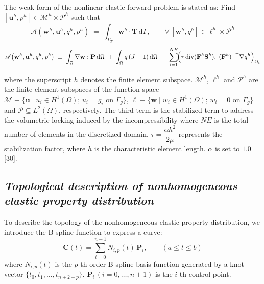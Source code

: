 \documentclass[11pt]{article}
\begin{document}
The weak form of the nonlinear elastic forward problem is stated as:
Find $[\mathbf{u}^h, p^h] \in \mathscr{M}^h \times \mathscr{P}^h$
such that
\begin{equation}
\mathscr{A}\!\left(\mathbf{w}^h,\mathbf{u}^h,q^h,p^h\right)
\;=\;
\int_{\Gamma_T}\! \mathbf{w}^h\!\cdot\mathbf{T}\,\mathrm{d}\Gamma,
\qquad
\forall\,[\mathbf{w}^h, q^h] \in \ell^h \times \mathscr{P}^h
\end{equation}
\begin{equation}
\mathscr{A}\!\left(\mathbf{w}^h,\mathbf{u}^h,q^h,p^h\right)
\;\equiv\;
\int_\Omega \nabla\mathbf{w}:\mathbf{P}\,\mathrm{d}\Omega
\;+\;
\int_\Omega q\,(J-1)\,\mathrm{d}\Omega
\;-\;
\sum_{i=1}^{NE}\!
 \Bigl(\tau\,\mathrm{div}(\mathbf{F}^h\mathbf{S}^h),\;
       (\mathbf{F}^h)^{-\mathsf{T}}\nabla q^h\Bigr)_{\Omega_i}
\end{equation}

\newpage

\setcounter{equation}{4}

\noindent
where the superscript $h$ denotes the finite element subspace.
$\mathscr{M}^h$, $\ell^h$ and $\mathscr{P}^h$ are the finite-element
subspaces of the function space
$\mathscr{M} \equiv \{\mathbf{u} \mid u_i \in H^1(\Omega);\,
u_i = g_i \text{ on } \Gamma_g\}$,
$\ell \equiv \{\mathbf{w} \mid w_i \in H^1(\Omega);\,
w_i = 0 \text{ on } \Gamma_g\}$ and
$\mathscr{P} \subseteq L^2(\Omega)$, respectively. The third term is
the stabilized term to address the volumetric locking induced by the
incompressibility where $NE$ is the total number of elements in the
discretized domain. $\tau = \dfrac{\alpha h^{2}}{2\mu}$ represents the
stabilization factor, where $h$ is the characteristic element length.
$\alpha$ is set to $1.0$ [30].

\subsection*{\textit{Topological description of nonhomogeneous elastic property distribution}}

\noindent
To describe the topology of the nonhomogeneous elastic property
distribution, we introduce the B-spline function to express a curve:
\begin{equation}
\mathbf{C}(t) = \sum_{i=0}^{n+1} N_{i,p}(t)\,\mathbf{P}_i,
\qquad (a \leq t \leq b)
\end{equation}
where $N_{i,p}(t)$ is the $p$-th order B-spline basis function
generated by a knot vector $\{t_0, t_1, \ldots, t_{n+2+p}\}$.
$\mathbf{P}_i\,(i = 0, \ldots, n+1)$ is the $i$-th control point.
\end{document}
